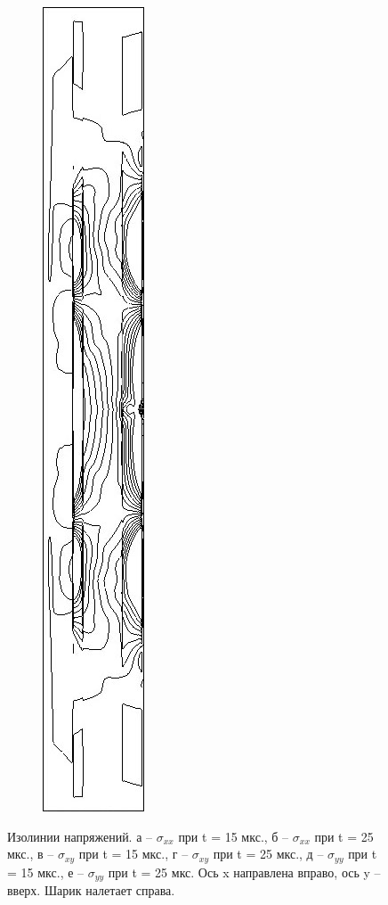 \begin{figure}[h]
\begin{subfigure}[b]{0.15\textwidth}
\caption{ }
\end{subfigure}
\begin{subfigure}[b]{0.15\textwidth}
\centering
\includegraphics[width=\textwidth]{png/cranium/2d-syy-02.png}
\caption{ }
\end{subfigure}
\caption{Изолинии напряжений. а -- $\sigma_{xx}$ при t = 15 мкс., б -- $\sigma_{xx}$ при t = 25 мкс., в -- $\sigma_{xy}$ при t = 15 мкс., г -- $\sigma_{xy}$ при t = 25 мкс., д -- $\sigma_{yy}$ при t = 15 мкс., е -- $\sigma_{yy}$ при t = 25 мкс. Ось x направлена вправо, ось y -- вверх. Шарик налетает справа.}
\label{pic:cranium_2d}
\end{figure}

